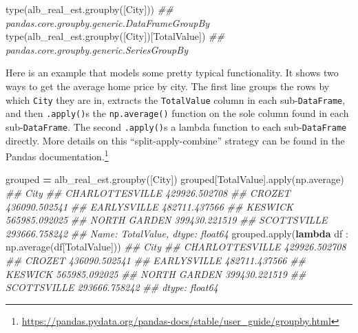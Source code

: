\documentclass[
  12pt,
  krantz2]{krantz}
\makeatletter
\newenvironment{Shaded}{\begin{snugshade}}{\end{snugshade}}
\newcommand{\BuiltInTok}[1]{#1}
\newcommand{\CommentTok}[1]{\textcolor[rgb]{0.37,0.37,0.37}{\textit{#1}}}
\newcommand{\KeywordTok}[1]{\textcolor[rgb]{0.27,0.27,0.27}{\textbf{#1}}}
\newcommand{\NormalTok}[1]{#1}
\newcommand{\OperatorTok}[1]{\textcolor[rgb]{0.43,0.43,0.43}{\textbf{#1}}}
\newcommand{\StringTok}[1]{\textcolor[rgb]{0.5,0.5,0.5}{#1}}
\renewcommand{\href}[2]{#2\footnote{\url{#1}}}
\newenvironment{kframe}{%
\medskip{}
\setlength{\fboxsep}{.8em}
 \def\at@end@of@kframe{}%
 \ifinner\ifhmode%
  \def\at@end@of@kframe{\end{minipage}}%
  \begin{minipage}{\columnwidth}%
 \fi\fi%
 \def\FrameCommand##1{\hskip\@totalleftmargin \hskip-\fboxsep
 \colorbox{shadecolor}{##1}\hskip-\fboxsep
     \hskip-\linewidth \hskip-\@totalleftmargin \hskip\columnwidth}%
 \MakeFramed {\advance\hsize-\width
   \@totalleftmargin\z@ \linewidth\hsize
   \@setminipage}}%
 {\par\unskip\endMakeFramed%
 \at@end@of@kframe}
\renewenvironment{Shaded}{\begin{kframe}}{\end{kframe}}
\makeatother
\begin{document}
\begin{Shaded}
\begin{Highlighting}[]
\BuiltInTok{type}\NormalTok{(alb\_real\_est.groupby([}\StringTok{\textquotesingle{}City\textquotesingle{}}\NormalTok{]))}
\CommentTok{\#\# pandas.core.groupby.generic.DataFrameGroupBy}
\BuiltInTok{type}\NormalTok{(alb\_real\_est.groupby([}\StringTok{\textquotesingle{}City\textquotesingle{}}\NormalTok{])[}\StringTok{\textquotesingle{}TotalValue\textquotesingle{}}\NormalTok{])}
\CommentTok{\#\# pandas.core.groupby.generic.SeriesGroupBy}
\end{Highlighting}
\end{Shaded}

Here is an example that models some pretty typical functionality. It shows two ways to get the average home price by city. The first line groups the rows by which \texttt{City} they are in, extracts the \texttt{TotalValue} column in each sub-\texttt{DataFrame}, and then \texttt{.apply()}s the \texttt{np.average()} function on the sole column found in each sub-\texttt{DataFrame}. The second \texttt{.apply()}s a lambda function to each sub-\texttt{DataFrame} directly. More details on this ``split-apply-combine'' strategy can be found in the \href{https://pandas.pydata.org/pandas-docs/stable/user_guide/groupby.html}{Pandas documentation.}

\begin{Shaded}
\begin{Highlighting}[]
\NormalTok{grouped }\OperatorTok{=}\NormalTok{ alb\_real\_est.groupby([}\StringTok{\textquotesingle{}City\textquotesingle{}}\NormalTok{])}
\NormalTok{grouped[}\StringTok{\textquotesingle{}TotalValue\textquotesingle{}}\NormalTok{].}\BuiltInTok{apply}\NormalTok{(np.average)}
\CommentTok{\#\# City}
\CommentTok{\#\# CHARLOTTESVILLE    429926.502708}
\CommentTok{\#\# CROZET             436090.502541}
\CommentTok{\#\# EARLYSVILLE        482711.437566}
\CommentTok{\#\# KESWICK            565985.092025}
\CommentTok{\#\# NORTH GARDEN       399430.221519}
\CommentTok{\#\# SCOTTSVILLE        293666.758242}
\CommentTok{\#\# Name: TotalValue, dtype: float64}
\NormalTok{grouped.}\BuiltInTok{apply}\NormalTok{(}\KeywordTok{lambda}\NormalTok{ df : np.average(df[}\StringTok{\textquotesingle{}TotalValue\textquotesingle{}}\NormalTok{]))}
\CommentTok{\#\# City}
\CommentTok{\#\# CHARLOTTESVILLE    429926.502708}
\CommentTok{\#\# CROZET             436090.502541}
\CommentTok{\#\# EARLYSVILLE        482711.437566}
\CommentTok{\#\# KESWICK            565985.092025}
\CommentTok{\#\# NORTH GARDEN       399430.221519}
\CommentTok{\#\# SCOTTSVILLE        293666.758242}
\CommentTok{\#\# dtype: float64}
\end{Highlighting}
\end{Shaded}
\end{document}
